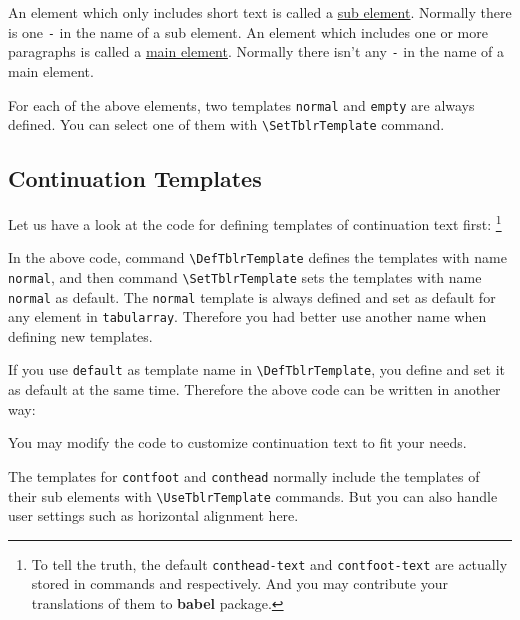 \documentclass[oneside]{book}
\begin{document}
An element which only includes short text is called a \underline{sub element}.
Normally there is one \verb!-! in the name of a sub element.
An element which includes one or more paragraphs is called a \underline{main element}.
Normally there isn't any \verb!-! in the name of a main element.

For each of the above elements, two templates \verb!normal! and \verb!empty! are always defined.
You can select one of them with \verb!\SetTblrTemplate! command.

\subsection{Continuation Templates}

Let us have a look at the code for defining templates of continuation text first:%
\footnote{To tell the truth, the default \texttt{conthead-text} and \texttt{contfoot-text}
are actually stored in commands \texttt{\string\tblrcontheadname} and \texttt{\string\tblrcontfootname}
respectively. And you may contribute your translations of them to \textbf{babel} package.}

\begin{codehigh}
\end{codehigh}

In the above code, command \verb!\DefTblrTemplate! defines the templates with name \verb!normal!,
and then command \verb!\SetTblrTemplate! sets the templates with name \verb!normal! as default.
The \verb!normal! template is always defined and set as default for any element in \verb!tabularray!.
Therefore you had better use another name when defining new templates.

If you use \verb!default! as template name in \verb!\DefTblrTemplate!,
you define and set it as default at the same time.
Therefore the above code can be written in another way:

\begin{codehigh}
\end{codehigh}

You may modify the code to customize continuation text to fit your needs.

The templates for \verb!contfoot! and \verb!conthead! normally
include the templates of their sub elements with \verb!\UseTblrTemplate! commands.
But you can also handle user settings such as horizontal alignment here.
\end{document}
